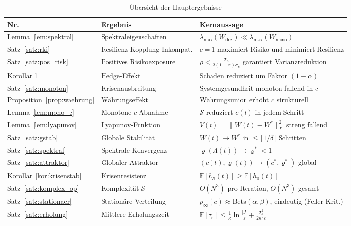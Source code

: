 \documentclass[a4paper, 12pt, twoside, openright]{report}
\theoremstyle{definition}
\theoremstyle{definition}
\begin{document}
\begin{table}[H]
\centering
\caption{Übersicht der Hauptergebnisse}
\begin{tabular}{llp{7.0cm}}
\toprule
\textbf{Nr.} & \textbf{Ergebnis} & \textbf{Kernaussage} \\
\midrule
Lemma~\ref{lem:spektral}    & Spektraleigenschaften   & $\lambda_{\max}(W_{\text{dez}}) \ll \lambda_{\max}(W_{\text{mono}})$ \\
Satz~\ref{satz:rki}         & Resilienz-Kopplung-Inkompat. & $c=1$ maximiert Risiko und minimiert Resilienz \\
Satz~\ref{satz:pos_risk}    & Positives Risikoexposure & $\rho < \frac{\sigma_h}{2(1-\alpha)\sigma_e}$ garantiert Varianzreduktion \\
Korollar 1                  & Hedge-Effekt            & Schaden reduziert um Faktor $(1-\alpha)$ \\
Satz~\ref{satz:monoton}     & Krisenausbreitung       & Systemgesundheit monoton fallend in $c$ \\
Proposition~\ref{prop:waehrung} & Währungseffekt      & Währungsunion erhöht $c$ strukturell \\
\midrule
Lemma~\ref{lem:mono_c}      & Monotone $c$-Abnahme    & $\mathcal{S}$ reduziert $c(t)$ in jedem Schritt \\
Lemma~\ref{lem:lyapunov}    & Lyapunov-Funktion       & $V(t)=\|W(t)-W^*\|_F^2$ streng fallend \\
Satz~\ref{satz:gstab}       & Globale Stabilität      & $W(t)\to W^*$ in $\leq\lceil 1/\delta\rceil$ Schritten \\
Satz~\ref{satz:spektral}    & Spektrale Konvergenz    & $\varrho(\Lambda(t))\to\varrho^*<1$ \\
Satz~\ref{satz:attraktor}   & Globaler Attraktor      & $(c(t),\varrho(t))\to(c^*,\varrho^*)$ global \\
Korollar~\ref{kor:krisenstab} & Krisenresistenz       & $\mathbb{E}[h_{\mathcal{S}}(t)]\geq\mathbb{E}[h_0(t)]$ \\
Satz~\ref{satz:komplex_op}  & Komplexität $\mathcal{S}$ & $O(N^3)$ pro Iteration, $O(N^3)$ gesamt \\
\midrule
Satz~\ref{satz:stationaer}  & Stationäre Verteilung     & $p_\infty(c)\approx\mathrm{Beta}(\alpha,\beta)$, eindeutig (Feller-Krit.) \\
Satz~\ref{satz:erholung}    & Mittlere Erholungszeit    & $\mathbb{E}[\tau_\varepsilon]\leq\frac{1}{\kappa}\ln\frac{|J|}{\varepsilon}+\frac{\sigma_d^2}{2\kappa^2\varepsilon}$ \\

\end{tabular}
\end{table}
\end{document}
